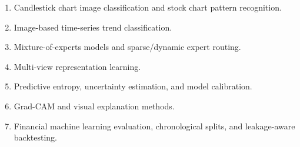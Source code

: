 \documentclass[
]{article}
\providecommand{\tightlist}{%
  \setlength{\itemsep}{0pt}\setlength{\parskip}{0pt}}
\begin{document}
\begin{enumerate}
\def\labelenumi{\arabic{enumi}.}
\tightlist
\item
  Candlestick chart image classification and stock chart pattern
  recognition.
\item
  Image-based time-series trend classification.
\item
  Mixture-of-experts models and sparse/dynamic expert routing.
\item
  Multi-view representation learning.
\item
  Predictive entropy, uncertainty estimation, and model calibration.
\item
  Grad-CAM and visual explanation methods.
\item
  Financial machine learning evaluation, chronological splits, and
  leakage-aware backtesting.
\end{enumerate}
\end{document}
